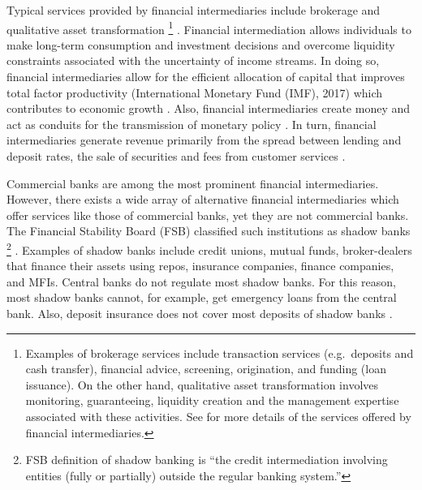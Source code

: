 \documentclass[a4paper,nobind]{templates/ociamthesis}
\begin{document}
Typical services provided by financial intermediaries include brokerage and qualitative asset transformation \footnote{Examples of brokerage services include transaction services (e.g.~deposits and cash transfer), financial advice, screening, origination, and funding (loan issuance). On the other hand, qualitative asset transformation involves monitoring, guaranteeing, liquidity creation and the management expertise associated with these activities. See \textcite{greenbaum2019contemporary} for more details of the services offered by financial intermediaries.} \autocite{greenbaum2019contemporary,gobat2017banksmatter}. Financial intermediation allows individuals to make long-term consumption and investment decisions and overcome liquidity constraints associated with the uncertainty of income streams\autocite{greenbaum2019contemporary}. In doing so, financial intermediaries allow for the efficient allocation of capital that improves total factor productivity (International Monetary Fund (IMF), 2017) which contributes to economic growth \autocite{chen2017microfinance}. Also, financial intermediaries create money and act as conduits for the transmission of monetary policy \autocite{greenbaum2019contemporary}. In turn, financial intermediaries generate revenue primarily from the spread between lending and deposit rates, the sale of securities and fees from customer services \autocite{cosci2015role}.

Commercial banks are among the most prominent financial intermediaries. However, there exists a wide array of alternative financial intermediaries which offer services like those of commercial banks, yet they are not commercial banks. The Financial Stability Board (FSB) classified such institutions as shadow banks \footnote{FSB definition of shadow banking is ``the credit intermediation involving entities (fully or partially) outside the regular banking system.''} \autocite{board2017assessment} . Examples of shadow banks include credit unions, mutual funds, broker-dealers that finance their assets using repos, insurance companies, finance companies, and MFIs. Central banks do not regulate most shadow banks. For this reason, most shadow banks cannot, for example, get emergency loans from the central bank. Also, deposit insurance does not cover most deposits of shadow banks \autocite{kodres2017shadowbanking}.
\end{document}
